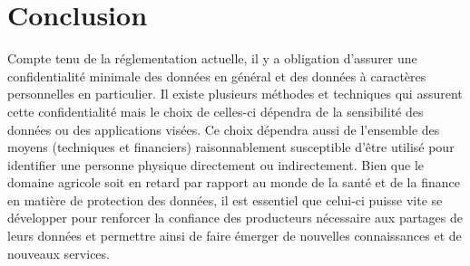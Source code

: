 \chapter{Conclusion}
Compte tenu de la réglementation actuelle, il y a obligation d'assurer une  confidentialité minimale  des données en général et des données à caractères personnelles en particulier. Il existe plusieurs méthodes et techniques qui assurent cette confidentialité mais le choix de celles-ci dépendra de la sensibilité des données ou des applications visées. Ce choix dépendra aussi de l'ensemble des moyens (techniques et financiers) raisonnablement susceptible d'être utilisé pour identifier une personne physique directement ou indirectement. Bien que le domaine agricole soit en retard par rapport au monde de la santé et de la finance en matière de protection des données, il est essentiel que celui-ci puisse vite se développer pour renforcer la confiance des producteurs nécessaire aux partages de leurs données et permettre ainsi de faire émerger de nouvelles connaissances et de nouveaux services.